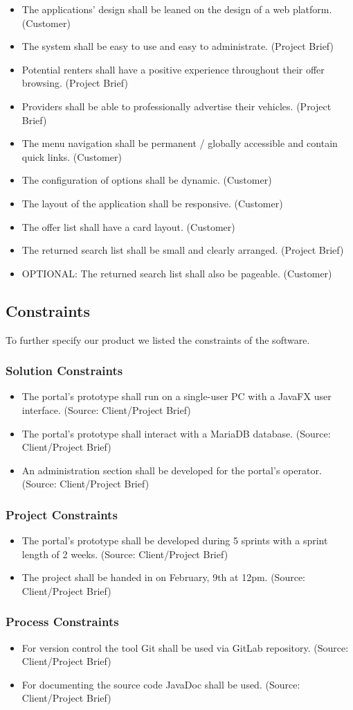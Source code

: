 \begin{itemize}
    \item The applications' design shall be leaned on the design of a web platform. (Customer)
    \item The system shall be easy to use and easy to administrate. (Project Brief)
    \item Potential renters shall have a positive experience throughout their offer browsing. (Project Brief)
    \item Providers shall be able to professionally advertise their vehicles. (Project Brief)
    \item The menu navigation shall be permanent / globally accessible and contain quick links. (Customer)
    \item The configuration of options shall be dynamic. (Customer)
    \item The layout of the application shall be responsive. (Customer)
    \item The offer list shall have a card layout. (Customer)
    \item The returned search list shall be small and clearly arranged. (Project Brief)
    \item OPTIONAL: The returned search list shall also be pageable. (Customer)
\end{itemize}


\subsection{Constraints}
To further specify our product we listed the constraints of the software.
\subsubsection{Solution Constraints}
\begin{itemize}
    \item The portal's prototype shall run on a single-user PC with a JavaFX user interface. (Source: Client/Project Brief)
    \item The portal's prototype shall interact with a MariaDB database. (Source: Client/Project Brief)
    \item An administration section shall be developed for the portal's operator. (Source: Client/Project Brief)
\end{itemize}
\subsubsection{Project Constraints}
\begin{itemize}
    \item The portal's prototype shall be developed during 5 sprints with a sprint length of 2 weeks. (Source: Client/Project Brief)
    \item The project shall be handed in on February, 9th at 12pm. (Source: Client/Project Brief)
\end{itemize}
\subsubsection{Process Constraints}
\begin{itemize}
    \item For version control the tool Git shall be used via GitLab repository. (Source: Client/Project Brief)
    \item For documenting the source code JavaDoc shall be used. (Source: Client/Project Brief)
\end{itemize}